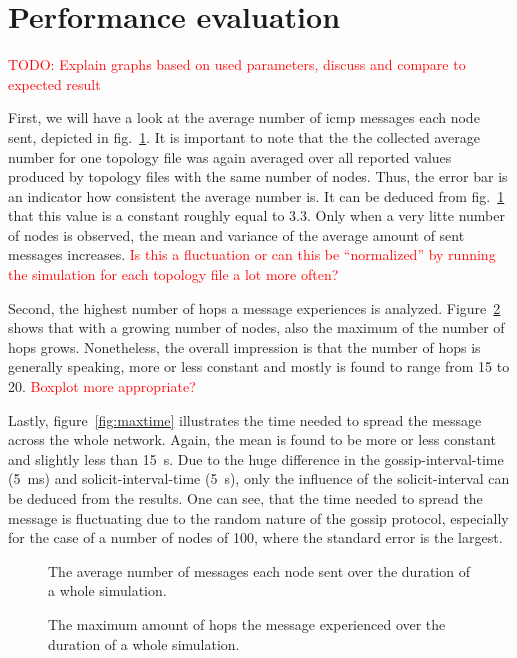 \documentclass[12pt,journal]{IEEEtran}
\begin{document}
\section{Performance evaluation}
\textcolor{red}{TODO: Explain graphs based on used parameters, discuss and compare to expected result}

First, we will have a look at the average number of icmp messages each node sent, depicted in fig.~\ref{fig:avgmsg}. It is important to note that the the collected average number for one topology file was again averaged over all reported values produced by topology files with the same number of nodes. Thus, the error bar is an indicator how consistent the average number is. It can be deduced from fig.~\ref{fig:avgmsg} that this value is a constant roughly equal to 3.3. Only when a very litte number of nodes is observed, the mean and variance of the average amount of sent messages increases. \textcolor{red}{Is this a fluctuation or can this be ``normalized'' by running the simulation for each topology file a lot more often?}

Second, the highest number of hops a message experiences is analyzed. Figure~\ref{fig:maxhops} shows that with a growing number of nodes, also the maximum of the number of hops grows. Nonetheless, the overall impression is that the number of hops is generally speaking, more or less constant and mostly is found to range from 15 to 20. \textcolor{red}{Boxplot more appropriate?}

Lastly, figure~\ref{fig:maxtime} illustrates the time needed to spread the message across the whole network. Again, the mean is found to be more or less constant and slightly less than 15~s. Due to the huge difference in the gossip-interval-time (5~ms) and solicit-interval-time (5~s), only the influence of the solicit-interval can be deduced from the results. One can see, that the time needed to spread the message is fluctuating due to the random nature of the gossip protocol, especially for the case of a number of nodes of 100, where the standard error is the largest.

\begin{figure}
 \centering
 \caption{The average number of messages each node sent over the duration of a whole simulation.}
 \label{fig:avgmsg}
\end{figure}

\begin{figure}
 \centering
 \caption{The maximum amount of hops the message experienced over the duration of a whole simulation.}
 \label{fig:maxhops}
\end{figure}
\end{document}
